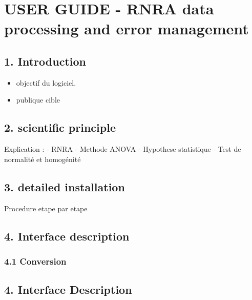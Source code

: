 \hypertarget{user-guide---rnra-data-processing-and-error-management}{%
\section{USER GUIDE - RNRA data processing and error
management}\label{user-guide---rnra-data-processing-and-error-management}}

\hypertarget{introduction}{%
\subsection{1. Introduction}\label{introduction}}

\begin{itemize}
\tightlist
\item
  objectif du logiciel.
\item
  publique cible
\end{itemize}

\hypertarget{scientific-principle}{%
\subsection{2. scientific principle}\label{scientific-principle}}

Explication : - RNRA - Methode ANOVA - Hypothese statistique - Test de
normalité et homogénité

\hypertarget{detailed-installation}{%
\subsection{3. detailed installation}\label{detailed-installation}}

Procedure etape par etape

\hypertarget{interface-description}{%
\subsection{4. Interface description}\label{interface-description}}

\hypertarget{conversion}{%
\subsubsection{4.1 Conversion}\label{conversion}}

\hypertarget{interface-description-1}{%
\subsection{4. Interface Description}\label{interface-description-1}}

